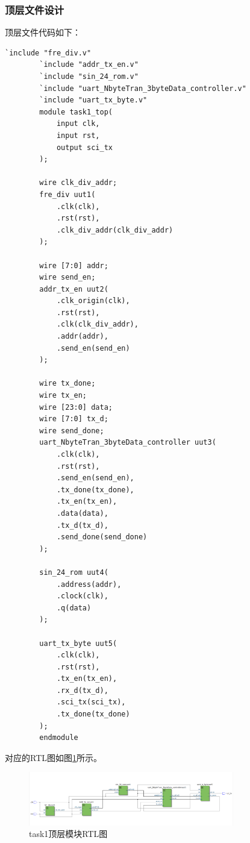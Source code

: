 \documentclass[UTF8]{ctexart}
\begin{document}
\subsubsection{顶层文件设计}
顶层文件代码如下：
\begin{framed}
    \begin{lstlisting}[style=verilogStyle]
        `include "fre_div.v"
        `include "addr_tx_en.v"
        `include "sin_24_rom.v"
        `include "uart_NbyteTran_3byteData_controller.v"
        `include "uart_tx_byte.v"
        module task1_top(
            input clk,
            input rst,
            output sci_tx
        );
        
        wire clk_div_addr;
        fre_div uut1(
            .clk(clk),
            .rst(rst),
            .clk_div_addr(clk_div_addr)
        );
        
        wire [7:0] addr;
        wire send_en;
        addr_tx_en uut2(
            .clk_origin(clk),
            .rst(rst),
            .clk(clk_div_addr),
            .addr(addr),
            .send_en(send_en)
        );
        
        wire tx_done;
        wire tx_en;
        wire [23:0] data;
        wire [7:0] tx_d;
        wire send_done;
        uart_NbyteTran_3byteData_controller uut3(
            .clk(clk),
            .rst(rst),
            .send_en(send_en),
            .tx_done(tx_done),
            .tx_en(tx_en),
            .data(data),
            .tx_d(tx_d),
            .send_done(send_done)
        );
        
        sin_24_rom uut4(
            .address(addr),
            .clock(clk),
            .q(data)
        );
        
        uart_tx_byte uut5(
            .clk(clk),
            .rst(rst),
            .tx_en(tx_en),
            .rx_d(tx_d),
            .sci_tx(sci_tx),
            .tx_done(tx_done)
        );  
        endmodule
    \end{lstlisting}
\end{framed}

对应的RTL图如图\ref{fig:task1_top_rtl}所示。
\begin{figure}[!ht]
    \centering
    \includegraphics[width=0.8\textwidth]{task1_top_rtl.png}
    \caption{task1顶层模块RTL图}
    \label{fig:task1_top_rtl}
\end{figure}
\end{document}
